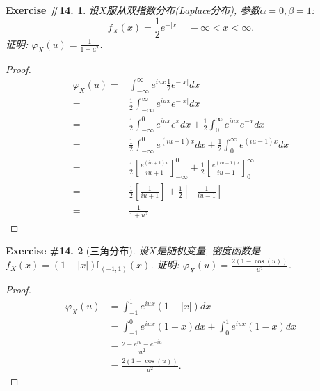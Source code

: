 \documentclass[UTF8, a4paper]{article}
\newtheorem{exercise}{Exercise \#14.}
\begin{document}
\begin{framed}
\begin{exercise}
设\(X\)服从双指数分布(Laplace分布), 参数\(\alpha = 0, \beta = 1\):
$$
f_X(x)=\frac{1}{2} e^{-|x|} \quad-\infty<x<\infty .
$$
证明: \(\varphi_X(u) = \frac{1}{1+u^2}\).
\end{exercise}
\end{framed}

\begin{proof}
$$
\begin{aligned}
    \varphi_X(u) =& \int_{-\infty}^{\infty} e^{iux} \frac{1}{2} e^{-|x|} dx \\
    =& \frac{1}{2} \int_{-\infty}^{\infty} e^{iux} e^{-|x|} dx \\
    =& \frac{1}{2} \int_{-\infty}^{0} e^{iux} e^{x} dx + \frac{1}{2} \int_{0}^{\infty} e^{iux} e^{-x} dx \\
    =& \frac{1}{2} \int_{-\infty}^{0} e^{(iu+1)x} dx + \frac{1}{2} \int_{0}^{\infty} e^{(iu-1)x} dx \\
    =& \frac{1}{2} \left[\frac{e^{(iu+1)x}}{iu+1}\right]_{-\infty}^{0} + \frac{1}{2} \left[\frac{e^{(iu-1)x}}{iu-1}\right]_{0}^{\infty} \\
    =& \frac{1}{2} \left[\frac{1}{iu+1} \right] + \frac{1}{2} \left[ - \frac{1}{iu-1}\right] \\
    =& \frac{1}{1+u^2}
\end{aligned}
$$
\end{proof}


\begin{framed}
\begin{exercise}[三角分布]
设\(X\)是随机变量, 密度函数是\(f_X(x) = (1 - |x|)\mathbb{I}_{(-1,1)}(x)\).
证明: \(\varphi_X(u) = \frac{2(1 - \cos(u))}{u^2}\).
\end{exercise}
\end{framed}

\begin{proof}
$$
\begin{aligned}
    \varphi_X(u) &= \int_{-1}^{1} e^{iux} (1 - |x|) dx \\
    &= \int_{-1}^{0} e^{iux} (1 + x) dx + \int_{0}^{1} e^{iux} (1 - x) dx \\
    & = \frac{2 - e^{iu} - e^{-iu}}{u^2} \\
    &= \frac{2(1 - \cos(u))}{u^2}.
\end{aligned}
$$
\end{proof}
\end{document}

